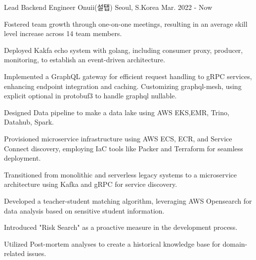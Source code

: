 

\begin{cventries}

  \cventry
    {Lead Backend Engineer} %
    {Onuii(설탭)} %
    {Seoul, S.Korea} %
    {Mar. 2022 - Now} %
    {
      \begin{cvitems} %
        \item {Fostered team growth through one-on-one meetings, resulting in an average skill level increase across 14 team members.}
        \item {Deployed Kakfa echo system with golang, including consumer proxy, producer, monitoring, to establish an event-driven architecture.}
        \item {Implemented a GraphQL gateway for efficient request handling to gRPC services, enhancing endpoint integration and caching. Customizing graphql-mesh, using explicit optional in protobuf3 to handle graphql nullable.}
        \item {Designed Data pipeline to make a data lake using AWS EKS,EMR, Trino, Datahub, Spark.}
        \item {Provisioned microservice infrastructure using AWS ECS, ECR, and Service Connect discovery, employing IaC tools like Packer and Terraform for seamless deployment.}
        \item {Transitioned from monolithic and serverless legacy systems to a microservice architecture using Kafka and gRPC for service discovery.}
        \item {Developed a teacher-student matching algorithm, leveraging AWS Opensearch for data analysis based on sensitive student information.}
        \item {Introduced "Risk Search" as a proactive measure in the development process.}
        \item {Utilized Post-mortem analyses to create a historical knowledge base for domain-related issues.}
      \end{cvitems}
    }


\end{cventries}

